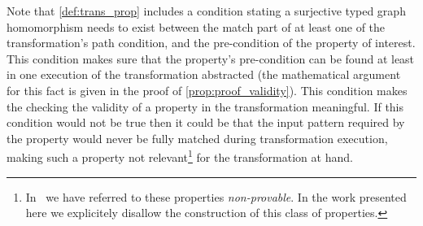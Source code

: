 Note that \cref{def:trans_prop} includes a condition stating a surjective typed graph homomorphism needs to exist between the match part of at least one of the transformation's path condition, and the pre-condition of the property of interest. This condition makes sure that the property's pre-condition can be found at least in one execution of the transformation abstracted (the mathematical argument for this fact is given in the proof of \cref{prop:proof_validity}). This condition makes the checking the validity of a property in the transformation meaningful. If this condition would not be true then it could be that the input pattern required by the property would never be fully matched during transformation execution, making such a property not relevant\footnote{In~\cite{DBLP:conf/sle/BarrocaLAFS10} we have referred to these properties \emph{non-provable}. In the work presented here we explicitely disallow the construction of this class of properties.} for the transformation at hand.





